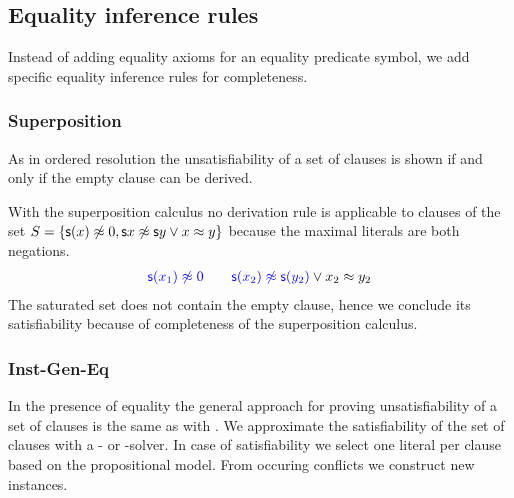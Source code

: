 \subsection{Equality inference rules}

Instead of adding equality axioms for an equality predicate symbol,
we add specific equality inference rules for completeness.


\subsubsection{Superposition}\label{sec:superposition}

As in ordered resolution the unsatisfiability of a set of clauses is shown
if and only if the empty clause can be derived.




\begin{example} With the superposition calculus no derivation rule is applicable
	to clauses of the set \( S = \{ \mathsf{s}(x)\not\approx 0, \mathsf{s}{x}\not\approx\mathsf{s}{y} \lor x\approx y \} \)
	because the maximal literals are both negations.
	\begin{align*}
	{\colN \msucc(x_1) \mNE 0}\qquad{\colN \msucc(x_2) \mNE \msucc(y_2)} \lor x_2\mEQ y_2
	\end{align*}
	The saturated set does not contain the empty clause, hence we conclude its satisfiability because of completeness of the superposition calculus.
\end{example}

\subsubsection{Inst-Gen-Eq}\label{sec:inst:gen:eq}

In the presence of equality the general approach
for proving unsatisfiability of a set of clauses
is the same as with \InstGen{}.
We approximate the satisfiability of the set of clauses with a \SAT{}- or \SMT{}-solver.
In case of satisfiability we select one literal per clause based on the propositional model.
From occuring conflicts we construct new instances.



%

